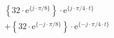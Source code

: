 \[
\begin{split}
&  \left \{ 32 \cdot \textrm{e}^{\{  j \cdot \pi/8 \}} \right \} \cdot \textrm{e}^{\{  j \cdot \pi/4 \cdot t \}}\\
&+ \left \{ 32 \cdot \textrm{e}^{\{ -j \cdot \pi/8 \}} \right \} \cdot \textrm{e}^{\{- j \cdot \pi/4 \cdot t \}}
\end{split}
\]

